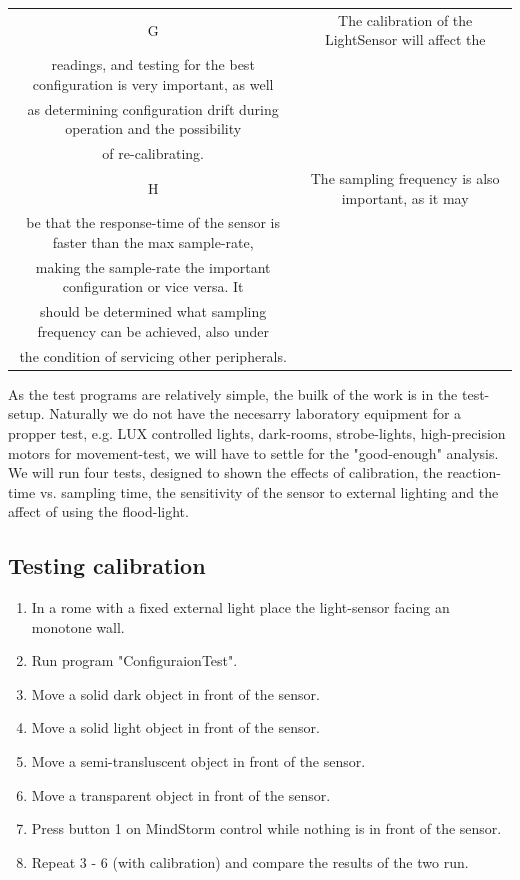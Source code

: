 \documentclass[11pt,a4]{article}
\begin{document}
\begin{table}[ht]
\begin{tabular}{c c}
G & The calibration of the LightSensor will affect the \\* readings, and testing for the best configuration is very important, as well \\* as determining configuration drift during operation and the possibility \\* of re-calibrating. \\
H & The sampling frequency is also important, as it may \\* be that the response-time of the sensor is faster than the max sample-rate, \\* making the sample-rate the important configuration or vice versa. It \\* should be determined what sampling frequency can be achieved, also under \\* the condition of servicing other peripherals. \\ [1ex]
\hline
\end{tabular}
\label{table:lightsensor_analysis_setup_description}
\end{table}
As the test programs are relatively simple, the builk of the work is in the test-setup. Naturally we do not have the necesarry laboratory equipment for a propper test, e.g. LUX controlled lights, dark-rooms, strobe-lights, high-precision motors for movement-test, we will have to settle for the "good-enough" analysis.
We will run four tests, designed to shown the effects of calibration, the reaction-time vs. sampling time, the sensitivity of the sensor to external lighting and the affect of using the flood-light.
\subsection{Testing calibration}
\begin{enumerate}
\item In a rome with a fixed external light place the light-sensor facing an monotone wall.
\item Run program "ConfiguraionTest".
\item Move a solid dark object in front of the sensor.
\item Move a solid light object in front of the sensor.
\item Move a semi-transluscent object in front of the sensor.
\item Move a transparent object in front of the sensor.
\item Press button 1 on MindStorm control while nothing is in front of the sensor.
\item Repeat 3 - 6 (with calibration) and compare the results of the two run.
\end{enumerate}
\end{document}
